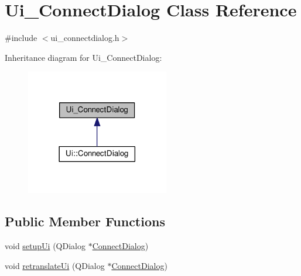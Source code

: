 \hypertarget{class_ui___connect_dialog}{}\section{Ui\+\_\+\+Connect\+Dialog Class Reference}
\label{class_ui___connect_dialog}


{\ttfamily \#include $<$ui\+\_\+connectdialog.\+h$>$}



Inheritance diagram for Ui\+\_\+\+Connect\+Dialog\+:
\nopagebreak
\begin{figure}[H]
\begin{center}
\leavevmode
\includegraphics[width=177pt]{class_ui___connect_dialog__inherit__graph}
\end{center}
\end{figure}
\subsection*{Public Member Functions}
\begin{DoxyCompactItemize}
\item 
void \hyperlink{class_ui___connect_dialog_a9176ff19214024ec2e1c4c55a5d3bc4d}{setup\+Ui} (Q\+Dialog $\ast$\hyperlink{class_connect_dialog}{Connect\+Dialog})
\item 
void \hyperlink{class_ui___connect_dialog_a4f8c2dbb30529f16dd87fa427dee6dda}{retranslate\+Ui} (Q\+Dialog $\ast$\hyperlink{class_connect_dialog}{Connect\+Dialog})
\end{DoxyCompactItemize}
